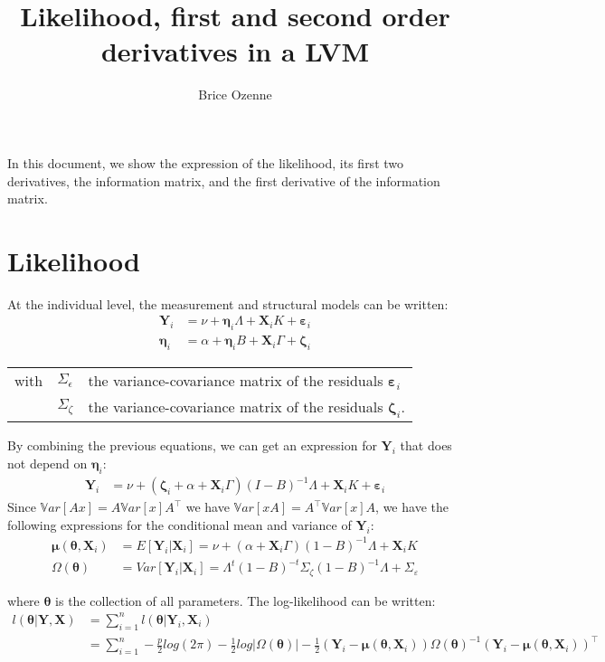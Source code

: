 \documentclass[table]{article}
\author{Brice Ozenne}
\date{}
\title{Likelihood, first and second order derivatives in a LVM}
\newcommand{\VX}{\boldsymbol{X}}
\newcommand{\VY}{\boldsymbol{Y}}
\newcommand{\Veta}{\boldsymbol{\eta}}
\newcommand{\Vvarepsilon}{\boldsymbol{\varepsilon}}
\newcommand{\Vmu}{\boldsymbol{\mu}}
\newcommand{\param}{\theta}
\newcommand{\Vparam}{\boldsymbol{\param}}
\newcommand\Var{\mathbb{V}ar}
\newcommand\trans[1]{{#1}^\intercal}%
\begin{document}
\maketitle
In this document, we show the expression of the likelihood, its first
two derivatives, the information matrix, and the first derivative of
the information matrix.

\section{Likelihood}
\label{sec:org20faa29}

At the individual level, the measurement and structural models can be written:
\begin{align*}
\VY_i &= \nu + \Veta_i \Lambda + \VX_i K + \Vvarepsilon_i \\
\Veta_i &= \alpha + \Veta_i B + \VX_i \Gamma + \boldsymbol{\zeta}_i 
\end{align*}
\begin{tabular}{lll}
with & \(\Sigma_{\epsilon}\)   &the variance-covariance matrix of the residuals \(\Vvarepsilon_i\)\\
     & \(\Sigma_{\zeta}\) & the variance-covariance matrix of the residuals \(\boldsymbol{\zeta}_i\). \\
\end{tabular}

\bigskip

By combining the previous equations, we can get an expression for
\(\VY_i\) that does not depend on \(\Veta_i\):
\begin{align*}
\VY_i &= \nu + \left(\boldsymbol{\zeta}_i + \alpha + \VX_i \Gamma \right) (I-B)^{-1} \Lambda + \VX_i K + \Vvarepsilon_i 
\end{align*}
Since \(\Var[Ax] = A \Var[x] \trans{A}\) we have \(\Var[xA] =
\trans{A} \Var[x] A\), we have the following expressions for the
conditional mean and variance of \(\VY_i\):
\begin{align*}
 \Vmu(\Vparam,\VX_i) &= E[\VY_i|\VX_i] = \nu + (\alpha + \VX_i \Gamma) (1-B)^{-1} \Lambda + \VX_i K \\
\Omega(\Vparam) &= Var[\VY_i|\VX_i] = \Lambda^t (1-B)^{-t}  \Sigma_{\zeta} (1-B)^{-1} \Lambda + \Sigma_{\varepsilon} 
\end{align*}

\bigskip

where \(\Vparam\) is the collection of all parameters. The
log-likelihood can be written:
\begin{align*}
l(\Vparam|\VY,\VX) &= \sum_{i=1}^n l(\Vparam|\VY_i,\VX_i) \\
&= \sum_{i=1}^{n} - \frac{p}{2} log(2\pi) - \frac{1}{2} log|\Omega(\Vparam)| - \frac{1}{2} (\VY_i-\Vmu(\Vparam,\VX_i)) \Omega(\Vparam)^{-1} \trans{(\VY_i-\Vmu(\Vparam,\VX_i))}
\end{align*}
\end{document}
